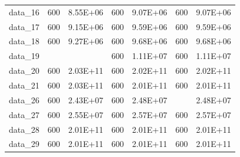 \begin{table}[]
\begin{tabular}{lllllll}
data\_16 & 600                                     & 8.55E+06                                   & 600                                  & 9.07E+06                                & 600                                     & 9.07E+06                                    \\
data\_17 & 600                                     & 9.15E+06                                   & 600                                  & 9.59E+06                                & 600                                     & 9.59E+06                                    \\
data\_18 & 600                                     & 9.27E+06                                   & 600                                  & 9.68E+06                                & 600                                     & 9.68E+06                                    \\
data\_19 &                                         &                                            & 600                                  & 1.11E+07                                & 600                                     & 1.11E+07                                    \\
data\_20 & 600                                     & 2.03E+11                                   & 600                                  & 2.02E+11                                & 600                                     & 2.02E+11                                    \\
data\_21 & 600                                     & 2.03E+11                                   & 600                                  & 2.01E+11                                & 600                                     & 2.01E+11                                    \\
data\_26 & 600                                     & 2.43E+07                                   & 600                                  & 2.48E+07                                &                                         & 2.48E+07                                    \\
data\_27 & 600                                     & 2.55E+07                                   & 600                                  & 2.57E+07                                & 600                                     & 2.57E+07                                    \\
data\_28 & 600                                     & 2.01E+11                                   & 600                                  & 2.01E+11                                & 600                                     & 2.01E+11                                    \\
data\_29 & 600                                     & 2.01E+11                                   & 600                                  & 2.01E+11                                & 600                                     & 2.01E+11                                    \\ \hline
\end{tabular}
\end{table}